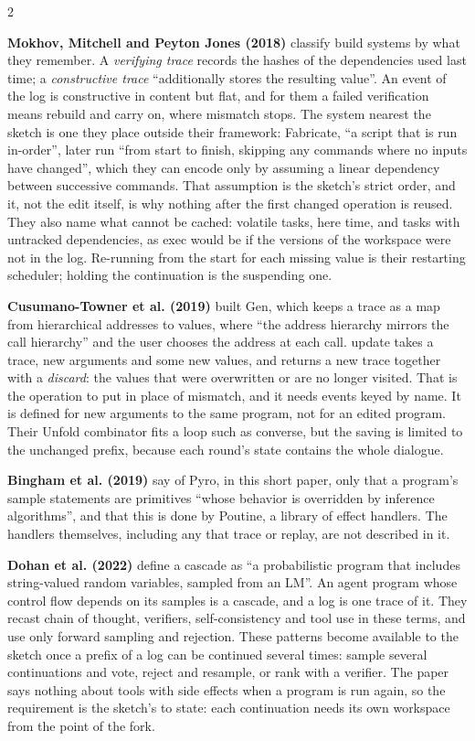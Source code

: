 \documentclass{article}
\newcommand{\topic}[1]{\par\medskip{\bfseries\normalsize #1}\par\smallskip}
\newcommand{\paper}[1]{\par\smallskip\textbf{#1}\quad}
\newcommand{\cd}[1]{{\ttfamily #1}}
\begin{document}
\begin{multicols}{2}
\paper{Mokhov, Mitchell and Peyton Jones (2018)} classify build systems by what they remember. A
\emph{verifying trace} records the hashes of the dependencies used last time; a
\emph{constructive trace} ``additionally stores the resulting value''. An event of the log is
constructive in content but flat, and for them a failed verification means rebuild and carry on,
where \cd{mismatch} stops. The system nearest the sketch is one they place outside their
framework: Fabricate, ``a script that is run in-order'', later run ``from start to finish,
skipping any commands where no inputs have changed'', which they can encode only by assuming a
linear dependency between successive commands. That assumption is the sketch's strict order, and
it, not the edit itself, is why nothing after the first changed operation is reused. They also
name what cannot be cached: volatile tasks, here \cd{time}, and tasks with
untracked dependencies, as \cd{exec} would be if the versions of the workspace were not in the
log. Re-running from the start for each missing
value is their restarting scheduler; holding the continuation is the suspending one.

\paper{Cusumano-Towner et al. (2019)} built Gen, which keeps a trace as a map from hierarchical addresses to
values, where ``the address hierarchy mirrors the call hierarchy'' and the user chooses the
address at each call. \cd{update} takes a trace, new arguments and some new values, and returns a
new trace together with a \emph{discard}: the values that were overwritten or are no longer
visited. That is the operation to put in place of \cd{mismatch}, and it needs events keyed by
name. It is defined for new arguments to the same program, not for an edited program. Their
\cd{Unfold} combinator fits a loop such as \cd{converse}, but the saving is limited to the
unchanged prefix, because each round's state contains the whole dialogue.

\topic{Model calls as random choices}

\paper{Bingham et al. (2019)} say of Pyro, in this short paper, only that a program's \cd{sample}
statements are primitives ``whose behavior is overridden by inference algorithms'', and that this
is done by Poutine, a library of effect handlers. The handlers themselves, including any that
trace or replay, are not described in it.

\paper{Dohan et al. (2022)} define a cascade as ``a probabilistic program that includes
string-valued random variables, sampled from an LM''. An agent program whose control flow depends
on its samples is a cascade, and a log is one trace of it. They recast chain of thought,
verifiers, self-consistency and tool use in these terms, and use only forward sampling and
rejection. These patterns become available to the sketch once a prefix of a log can be continued
several times: sample several continuations and vote, reject and resample, or rank with a
verifier. The paper says nothing about tools with side effects when a program is run again, so
the requirement is the sketch's to state: each continuation needs its own workspace from the
point of the fork.


\end{multicols}
\end{document}
